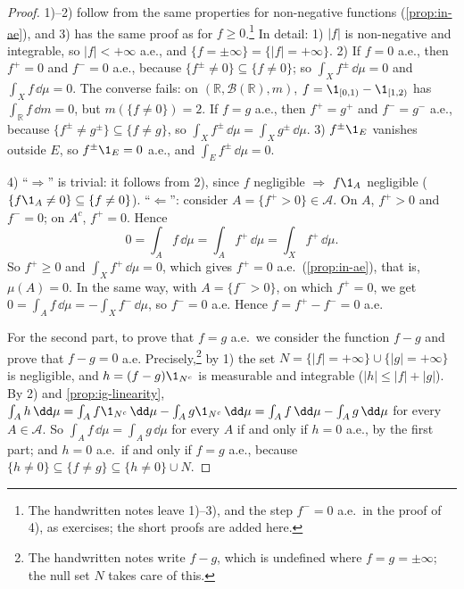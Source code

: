 \begin{proof}
1)--2) follow from the same properties for non-negative functions (\cref{prop:in-ae}), and 3)
has the same proof as for $f\ge0$.\footnote{The handwritten notes leave 1)--3), and the step
$f^-=0$ a.e.\ in the proof of 4), as exercises; the short proofs are added here.} In detail: 1) $|f|$ is non-negative and integrable, so
$|f|<+\infty$ a.e., and $\{f=\pm\infty\}=\{|f|=+\infty\}$. 2) If $f=0$ a.e., then $f^+=0$ and
$f^-=0$ a.e., because $\{f^\pm\ne0\}\subseteq\{f\ne0\}$; so $\int_Xf^\pm\,\dd\mu=0$ and
$\int_Xf\,\dd\mu=0$. The converse fails: on $(\mathbb R,\mathcal B(\mathbb R),m)$,
$f=\1_{[0,1)}-\1_{[1,2)}$ has $\int_{\mathbb R}f\,\dd m=0$, but $m(\{f\ne0\})=2$. If $f=g$ a.e., then
$f^+=g^+$ and $f^-=g^-$ a.e., because $\{f^\pm\ne g^\pm\}\subseteq\{f\ne g\}$, so
$\int_Xf^\pm\,\dd\mu=\int_Xg^\pm\,\dd\mu$. 3) $f^\pm\1_E$ vanishes outside $E$, so
$f^\pm\1_E=0$ a.e., and $\int_Ef^\pm\,\dd\mu=0$.

4) ``$\Rightarrow$'' is trivial: it follows from 2), since $f$ negligible $\Rightarrow$ $f\1_A$
negligible ($\{f\1_A\ne0\}\subseteq\{f\ne0\}$). ``$\Leftarrow$'': consider
$A=\{f^+>0\}\in\mathcal A$. On $A$, $f^+>0$ and $f^-=0$; on $A^c$, $f^+=0$. Hence
\[
  0=\int_Af\,\dd\mu=\int_Af^+\,\dd\mu=\int_Xf^+\,\dd\mu .
\]
So $f^+\ge0$ and $\int_Xf^+\,\dd\mu=0$, which gives $f^+=0$ a.e.\ (\cref{prop:in-ae}), that
is, $\mu(A)=0$. In the same way, with $A=\{f^->0\}$, on which $f^+=0$, we get
$0=\int_Af\,\dd\mu=-\int_Xf^-\,\dd\mu$, so $f^-=0$ a.e. Hence $f=f^+-f^-=0$ a.e.

For the second part, to prove that $f=g$ a.e.\ we consider the function $f-g$ and prove that
$f-g=0$ a.e. Precisely,\footnote{The handwritten notes write $f-g$, which is undefined where
$f=g=\pm\infty$; the null set $N$ takes care of this.} by 1) the set
$N=\{|f|=+\infty\}\cup\{|g|=+\infty\}$ is negligible, and $h=(f-g)\1_{N^c}$ is measurable and
integrable ($|h|\le|f|+|g|$). By 2) and \cref{prop:ig-linearity},
$\int_Ah\,\dd\mu=\int_Af\1_{N^c}\,\dd\mu-\int_Ag\1_{N^c}\,\dd\mu=\int_Af\,\dd\mu-\int_Ag\,\dd\mu$
for every $A\in\mathcal A$. So $\int_Af\,\dd\mu=\int_Ag\,\dd\mu$ for every $A$ if and only if
$h=0$ a.e., by the first part; and $h=0$ a.e.\ if and only if $f=g$ a.e., because
$\{h\ne0\}\subseteq\{f\ne g\}\subseteq\{h\ne0\}\cup N$.
\end{proof}

